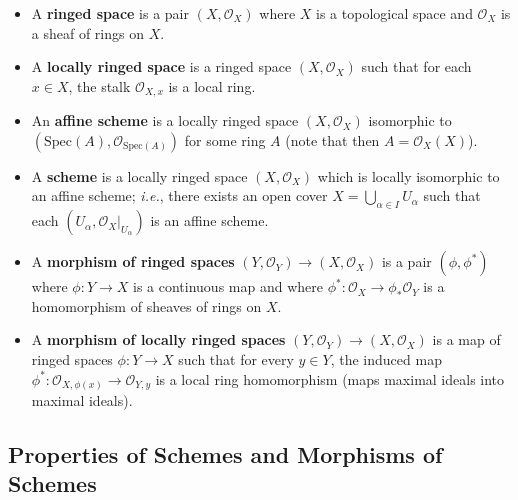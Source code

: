 \documentclass{template}
\begin{document}
\begin{definition}
    \begin{itemize}
        \item A \textbf{ringed space} is a pair $(X,\mathcal{O}_X)$ where $X$ is a topological
    space and $\mathcal{O}_X$ is a sheaf of rings on $X$.
        \item A \textbf{locally ringed space} is a ringed space $(X,\mathcal{O}_X)$ such 
        that for each $x \in X$, the stalk $\mathcal{O}_{X,x}$ is a local ring.
    \end{itemize}
\end{definition}

\begin{definition}
    \begin{itemize}
        \item An \textbf{affine scheme} is a locally ringed space $(X,\mathcal{O}_X)$
        isomorphic to $(\text{Spec}(A), \mathcal{O}_{\text{Spec}(A)})$ for some 
        ring $A$ (note that then $A=\mathcal{O}_X(X)$).
        \item A \textbf{scheme} is a locally ringed space $(X,\mathcal{O}_X)$ which 
        is locally isomorphic to an affine scheme; \textit{i.e.}, there exists an 
        open cover $X = \bigcup_{\alpha \in I}U_{\alpha}$ such that each 
        $(U_{\alpha},\mathcal{O}_X|_{U_{\alpha}})$ is an affine scheme.
        \item A \textbf{morphism of ringed spaces} $(Y,\mathcal{O}_Y) \to (X,\mathcal{O}_X)$ is a pair $(\phi,\phi^*)$ where $\phi: Y \to X$ is a continuous map and 
        where $\phi^*: \mathcal{O}_X \to \phi_*\mathcal{O}_Y$ is a homomorphism of sheaves of rings on $X$.
        \item A \textbf{morphism of locally ringed spaces} $(Y,\mathcal{O}_Y) \to (X,\mathcal{O}_X)$ is 
        a map of ringed spaces $\phi: Y \to X$ such that for every $y \in Y$, the induced map $\phi^*: \mathcal{O}_{X,\phi(x)} \to \mathcal{O}_{Y,y}$ is a local ring homomorphism (maps maximal ideals into maximal ideals).
    \end{itemize}
\end{definition}

\subsection{Properties of Schemes and Morphisms of Schemes}
\end{document}
